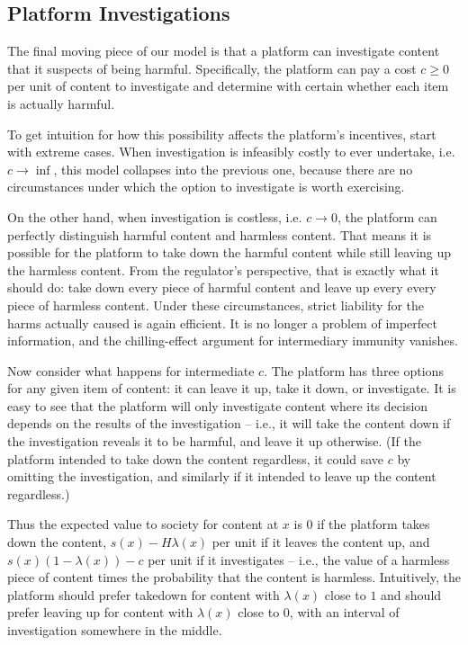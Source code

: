 \subsection{Platform Investigations}

The final moving piece of our model is that a platform can investigate content that it suspects of being harmful. Specifically, the platform can pay a cost $c \ge 0$  per unit of content to investigate and determine with certain whether each item is actually harmful.

To get intuition for how this possibility affects the platform's incentives, start with extreme cases. When investigation is infeasibly costly to ever undertake, i.e. $c \to \inf$, this model collapses into the previous one, because there are no circumstances under which the option to investigate is worth exercising.

On the other hand, when investigation is costless, i.e. $c \to 0$, the platform can  perfectly distinguish harmful content and harmless content. That means it is possible for the platform to take down the harmful content while still leaving up the harmless content. From the regulator's perspective, that is exactly what it should do: take down every piece of harmful content and leave up every every piece of harmless content. Under these circumstances, strict liability for the harms actually caused is again efficient. It is no longer a problem of imperfect information, and the chilling-effect argument for intermediary immunity vanishes.

Now consider what happens for intermediate $c$. The platform has three options for any given item of content: it can leave it up, take it down, or investigate. It is easy to see that the platform will only investigate content where its decision depends on the results of the investigation -- i.e.,  it will take the content down if the investigation reveals it to be harmful, and leave it up otherwise. (If the platform intended to take down the content regardless, it could save $c$ by omitting the investigation, and similarly if it intended to leave up the content regardless.)

Thus the expected value to society for content at $x$ is $0$ if the platform takes down the content, $s(x) - H\lambda(x)$ per unit if it leaves the content up, and $s(x)(1 - \lambda(x)) - c$ per unit if it investigates -- i.e., the value of a harmless piece of content times the probability that the content is harmless. Intuitively, the platform should prefer takedown for content with $\lambda(x)$ close to $1$ and should prefer leaving up for content with $\lambda(x)$ close to $0$, with an interval of investigation somewhere in the middle. 

